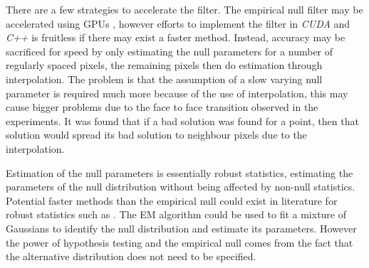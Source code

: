 There are a few strategies to accelerate the filter. The empirical null filter may be accelerated using GPUs \citep{yang2008parallel, hwu2011gpu, eklund2013medical}, however efforts to implement the filter in \emph{CUDA} and \emph{C++} is fruitless if there may exist a faster method. Instead, accuracy may be sacrificed for speed by only estimating the null parameters for a number of regularly spaced pixels, the remaining pixels then do estimation through interpolation. The problem is that the assumption of a slow varying null parameter is required much more because of the use of interpolation, this may cause bigger problems due to the face to face transition observed in the experiments. It was found that if a bad solution was found for a point, then that solution would spread its bad solution to neighbour pixels due to the interpolation.

Estimation of the null parameters is essentially robust statistics, estimating the parameters of the null distribution without being affected by non-null statistics. Potential faster methods than the empirical null could exist in literature for robust statistics such as \cite{hampel1986robust, rousseeuw1987robust, maronna2006robust, huber2009robust, jewson2018principles}. The EM algorithm \citep{dempster1977maximum} could be used to fit a mixture of Gaussians to identify the null distribution and estimate its parameters. However the power of hypothesis testing and the empirical null comes from the fact that the alternative distribution does not need to be specified.